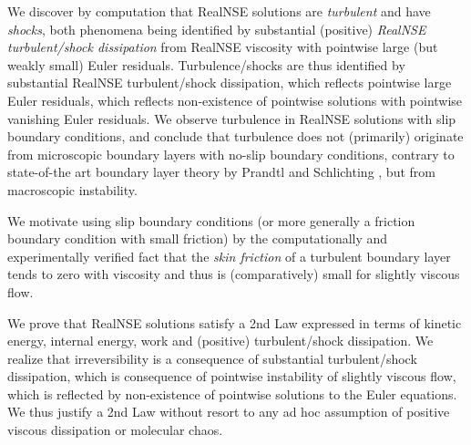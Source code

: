   


We discover by computation that RealNSE solutions
are \emph{turbulent} and have \emph{shocks}, 
both phenomena being identified by substantial (positive) 
\emph{RealNSE turbulent/shock dissipation} from RealNSE viscosity 
with pointwise large (but weakly small) Euler residuals. Turbulence/shocks  
are thus identified by substantial RealNSE 
turbulent/shock dissipation, which reflects 
pointwise large Euler residuals, which reflects non-existence
of pointwise solutions with pointwise 
vanishing Euler residuals. We observe 
turbulence in RealNSE solutions with slip boundary conditions, 
and conclude that turbulence does not (primarily) originate from microscopic 
boundary layers with no-slip boundary conditions, contrary
to state-of-the art boundary layer theory by Prandtl and 
Schlichting \cite{prandtl,schlichting}, but from macroscopic instability.

We  motivate using slip boundary conditions 
(or more generally a friction boundary condition with small friction) 
by the computationally and experimentally
verified fact that the \emph{skin friction} of a turbulent
boundary layer tends to zero with viscosity and thus is 
(comparatively) small for slightly viscous flow. 

We prove that RealNSE solutions satisfy a 2nd Law 
expressed in terms of kinetic energy, internal energy, work and 
(positive) turbulent/shock dissipation.
We realize that irreversibility 
is a consequence of substantial turbulent/shock dissipation, 
which is consequence of pointwise instability of slightly viscous flow, 
which is reflected by non-existence of pointwise solutions to
the Euler equations. We thus justify a 2nd Law without resort to any 
ad hoc assumption of positive viscous dissipation or molecular chaos.  

  
 


